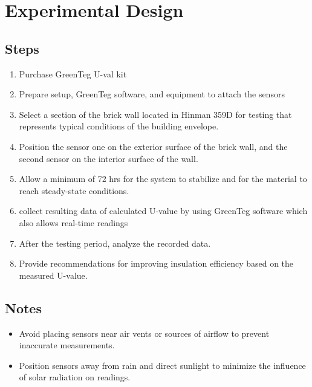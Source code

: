 \documentclass[12pt]{article}
\begin{document}
\section*{Experimental Design}
\subsection*{Steps}
\begin{enumerate}

    \item Purchase GreenTeg U-val kit
    \item Prepare setup, GreenTeg software, and equipment to attach the sensors
     \item  Select a section of the brick wall located in Hinman 359D for testing that represents typical conditions of the building envelope.
     \item  Position the sensor one on the exterior surface of the brick wall, and the second sensor on the interior surface of the wall.
    \item  Allow a minimum of 72 hrs for the system to stabilize and for the material to reach steady-state conditions.
    \item collect resulting data of calculated U-value by using GreenTeg software which also allows real-time readings
     \item  After the testing period, analyze the recorded data.
 \item Provide recommendations for improving insulation efficiency based on the measured U-value.


    
\end{enumerate}





\subsection*{Notes}
\begin{itemize}
    \item Avoid placing sensors near air vents or sources of airflow to prevent inaccurate measurements.
    \item Position sensors away from rain and direct sunlight to minimize the influence of solar radiation on readings.
\end{itemize}
\end{document}
